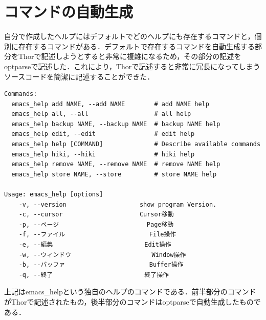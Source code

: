 \section{コマンドの自動生成}\label{}

自分で作成したヘルプにはデフォルトでどのヘルプにも存在するコマンドと，個別に存在するコマンドがある．デフォルトで存在するコマンドを自動生成する部分をThorで記述しようとすると非常に複雑になるため，その部分の記述をoptparseで記述した．これにより，Thorで記述すると非常に冗長になってしまうソースコードを簡潔に記述することができた．

\begin{screen}
{\small
\begin{verbatim}
Commands:
  emacs_help add NAME, --add NAME        # add NAME help
  emacs_help all, --all                  # all help
  emacs_help backup NAME, --backup NAME  # backup NAME help
  emacs_help edit, --edit                # edit help
  emacs_help help [COMMAND]              # Describe available commands
  emacs_help hiki, --hiki                # hiki help
  emacs_help remove NAME, --remove NAME  # remove NAME help
  emacs_help store NAME, --store         # store NAME help

Usage: emacs_help [options]
    -v, --version                    show program Version.
    -c, --cursor                     Cursor移動
    -p, --ページ                        Page移動
    -f, --ファイル                       File操作
    -e, --編集                         Edit操作
    -w, --ウィンドウ                      Window操作
    -b, --バッファ                       Buffer操作
    -q, --終了                         終了操作
\end{verbatim}}
\end{screen}

上記はemacs\_helpという独自のヘルプのコマンドである．前半部分のコマンドがThorで記述されたもの，後半部分のコマンドはoptparseで自動生成したものである．



